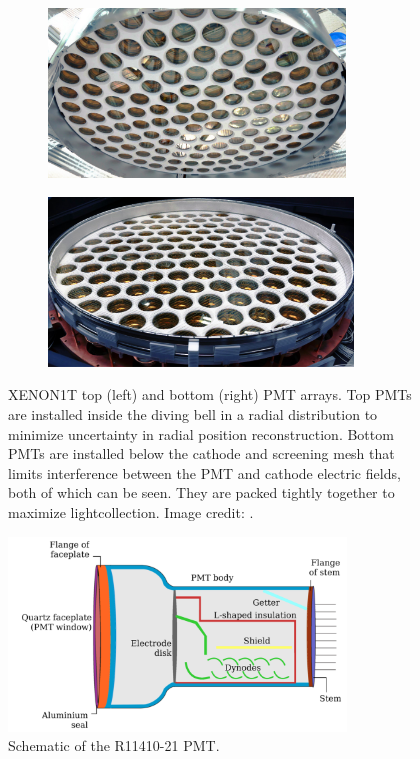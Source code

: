 \begin{figure}
    \centering
    \begin{subfigure}[t]{0.45\textwidth}
        \centering
        \includegraphics[height=4.5cm]{PMTTopArray}
    \end{subfigure}%
    \begin{subfigure}[t]{0.45\textwidth}
        \centering
        \includegraphics[height=4.5cm]{PMTBottomArray}
    \end{subfigure}
    \caption{XENON1T top (left) and bottom (right) PMT arrays.  Top PMTs are installed inside the diving bell in a radial distribution
    to minimize uncertainty in radial position reconstruction.  Bottom PMTs are installed below the cathode and screening mesh that
    limits interference between the PMT and cathode electric fields, both of which can be seen.  They are packed tightly
    together to maximize lightcollection.  Image credit: .}
	\label{fig:xenon1t_pmt_array}
\end{figure}

\begin{figure}
\centering
\includegraphics[width=0.8\textwidth]{PMTSchematic}
\caption{Schematic of the R11410-21 PMT.}
\label{fig:xenon1t_hamamatsu_pmt}
\end{figure}

